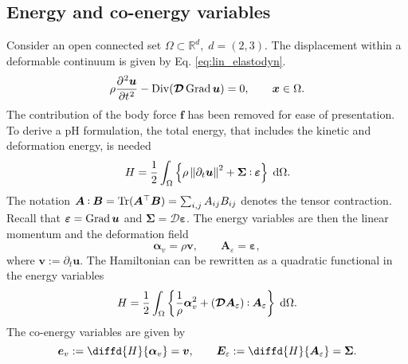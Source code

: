 \subsection{Energy and co-energy variables}
Consider an open connected set $\Omega \subset \mathbb{R}^d, \; d=(2,3)$. The displacement within a deformable continuum is given by Eq. \eqref{eq:lin_elastodyn}. 
\begin{equation}
\rho \diffp[2]{\bm{u}}{t} - \Div(\bm{\mathcal{D}} \Grad \bm{u}) =0, \qquad \bm{x} \in \Omega.
\end{equation}
The contribution of the body force $\bm{f}$ has been removed for ease of presentation. To derive a pH formulation, the total energy, that includes the kinetic and  deformation energy, is needed
\begin{equation}
	H = \energy{\rho \norm{\partial_t \bm{u}}^2 + \bm{\Sigma} \cddot \bm{\varepsilon}}.
\end{equation}
The notation $\bm{A}\cddot \bm{B} = \Tr(\bm{A}^\top\bm{B}) = \sum_{i, j} A_{ij} B_{ij}$ denotes the tensor contraction. Recall that $\bm{\varepsilon}= \operatorname*{Grad}{\bm{u}}$ and $\bm{\Sigma}=\bm{\mathcal{D}}\bm{\varepsilon}$. The energy variables are then the linear momentum and the deformation field
\begin{equation*}
\bm{\alpha}_v = \rho \bm{v}, \qquad \bm{A}_{\varepsilon} = \bm{\varepsilon},
\end{equation*}
where $\bm{v}:= \partial_t \bm{u}$. The Hamiltonian can be rewritten as a quadratic functional in the energy variables
\begin{equation}
H = \energy{\frac{1}{\rho} \bm{\alpha}_v^2 + (\bm{\mathcal{D}} \bm{A}_{\varepsilon}) \cddot  \bm{A}_{\varepsilon}}.
\end{equation}
The co-energy variables are given by
\begin{equation}
\bm{e}_v := \diffd{H}{\bm{\alpha}_v} = \bm{v}, \qquad \bm{E}_\varepsilon := \diffd{H}{\bm{A}_{\varepsilon}} = \bm{\Sigma}.
\end{equation}  

